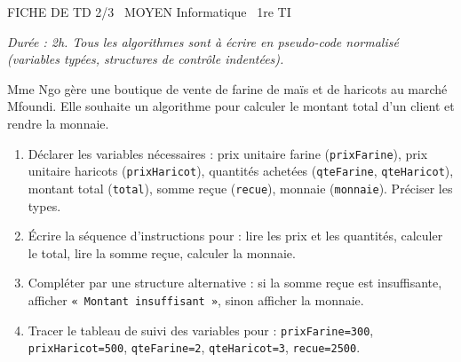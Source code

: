 \documentclass[11pt]{article}
\begin{document}
\begin{tcolorbox}[enhanced,colback=popink,colframe=popink,arc=10pt,boxrule=0pt,left=12pt,right=12pt,top=9pt,bottom=9pt]
{\color{white}\popxbold\small FICHE DE TD 2/3 \textbullet\ MOYEN \hfill Informatique \textbullet\ 1re TI\par}
\end{tcolorbox}
\vspace{4pt}
\emph{Durée : 2h. Tous les algorithmes sont à écrire en pseudo-code normalisé (variables typées, structures de contrôle indentées).}

\begin{exercice}
Mme Ngo gère une boutique de vente de farine de maïs et de haricots au marché Mfoundi. Elle souhaite un algorithme pour calculer le montant total d'un client et rendre la monnaie.
\begin{enumerate}
    \item Déclarer les variables nécessaires : prix unitaire farine (\texttt{prixFarine}), prix unitaire haricots (\texttt{prixHaricot}), quantités achetées (\texttt{qteFarine}, \texttt{qteHaricot}), montant total (\texttt{total}), somme reçue (\texttt{recue}), monnaie (\texttt{monnaie}). Préciser les types.
    \item Écrire la séquence d'instructions pour : lire les prix et les quantités, calculer le total, lire la somme reçue, calculer la monnaie.
    \item Compléter par une structure alternative : si la somme reçue est insuffisante, afficher \texttt{« Montant insuffisant »}, sinon afficher la monnaie.
    \item Tracer le tableau de suivi des variables pour : \texttt{prixFarine=300}, \texttt{prixHaricot=500}, \texttt{qteFarine=2}, \texttt{qteHaricot=3}, \texttt{recue=2500}.
\end{enumerate}
\end{exercice}
\end{document}
